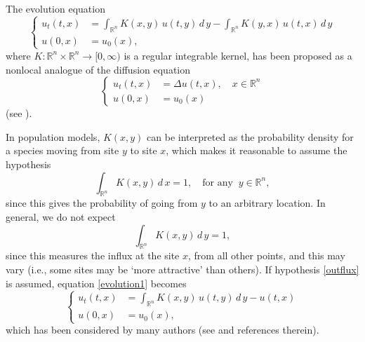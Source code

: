 \documentclass[a4paper,12pt]{amsart}
\newcommand{\R}{\mathbb{R}}
\begin{document}
   The  evolution equation
   \begin{equation}
   \label{evolution1}
 \begin{cases} u_t(t,x) & = \int_{\R^n}   K(x,y) \, u(t,y) \,  d\,y
      - \int_{\R^n}  K(y,x) \,  u(t,x) \,  d\,y \\
      u(0,x) & = u_0(x),
      \end{cases}
      \end{equation}
   where  $K: \R^n \times \R^n  \to {[0,\infty)}$  is a regular integrable kernel,  has been proposed as a nonlocal analogue of the diffusion equation
    \begin{equation*}
      \begin{cases} u_t(t,x) & = \Delta u(t,x), \quad x\in \R^n \\
      u(0,x) & = u_0(x)
      \end{cases}
     \end{equation*}
  (see \cite{fife}).

    In population models, $K(x,y)$  can be interpreted as the probability density  for  a species moving from site $y$ to site $x$, which makes it reasonable to assume the  hypothesis
     \begin{equation} \label{outflux} \int_{\R^n} K(x,y) \, d\,x = 1
     , \quad \textrm{for any }  \ y \in \R^n,
     \end{equation}
     since this gives the probability of going from $y$ to an arbitrary location.
        In general, we do not  expect
     \begin{equation} \label{influx}
    \int_{\R^n} K(x,y) \, d\,y = 1,
      \end{equation}
        since this measures the influx at the site $x$, from all other points, and this  may vary (i.e., some sites may be `more attractive' than others).
   If { hypothesis  \eqref{outflux}} is assumed,  equation \eqref{evolution1} becomes
     \begin{equation*}
      \begin{cases} u_t(t,x) & = \int_{\R^n}   K(x,y) \,
       u(t,y) \,  d\,y
      -  u(t,x)  \\
      u(0,x) & = u_0(x),
      \end{cases}
     \end{equation*}
   which has been considered by many authors (see \cite{rossi} and references therein).
\end{document}
